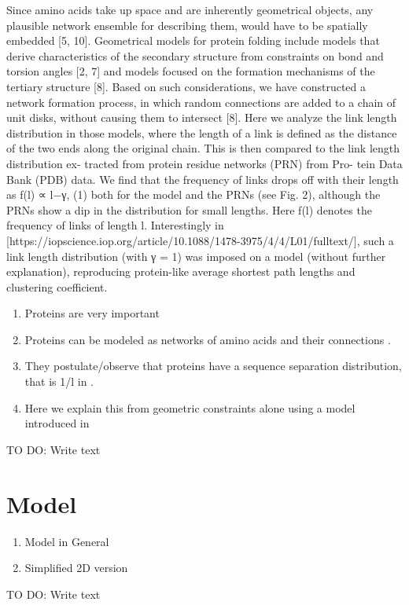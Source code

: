 \documentclass[reprint,amsmath,amssymb,rmp,onecolumn,notitlepage,11pt]{revtex4-1}
\begin{document}
Since amino acids take up space and are inherently geometrical objects, any plausible network ensemble for describing them, would have to be spatially embedded [5, 10]. Geometrical models for protein folding include models that derive characteristics of the secondary structure from constraints on bond and torsion angles [2, 7] and models focused on the formation mechanisms of the tertiary structure [8]. Based on such considerations, we have constructed a network formation process, in which random connections are added to a chain of unit disks, without causing them to intersect [8]. Here we analyze the link length distribution in those models, where the length of a link is defined as the distance of the two ends along the original chain.
This is then compared to the link length distribution ex- tracted from protein residue networks (PRN) from Pro- tein Data Bank (PDB) data. We find that the frequency of links drops off with their length as
f(l) ∝ l−γ, (1)
both for the model and the PRNs (see Fig. 2), although the PRNs show a dip in the distribution for small lengths. Here f(l) denotes the frequency of links of length l. Interestingly in [https://iopscience.iop.org/article/10.1088/1478-3975/4/4/L01/fulltext/], such a link length distribution (with γ = 1) was imposed on a model (without further explanation), reproducing protein-like average shortest path lengths and clustering coefficient.
\begin{enumerate}
    \item Proteins are very important \cite{a bunch of stuff}
    \item Proteins can be modeled as networks of amino acids and their connections \cite{Vendruscolo2002,DiPaola2013,Estrada2011}.
    \item They postulate/observe that proteins have a sequence separation distribution, that is 1/l in \cite{bartoli2008effect}.
    \item Here we explain this from geometric constraints alone using a model introduced in \cite{Molkenthin2016,molkenthin2020self}
\end{enumerate}
TO DO: Write text
\section*{Model}
\begin{enumerate}
    \item Model in General
    \item Simplified 2D version
\end{enumerate}
TO DO: Write text
\end{document}
